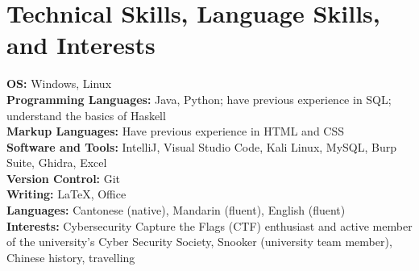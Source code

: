 \documentclass[letterpaper,10pt]{article}
\begin{document}
\section{Technical Skills, Language Skills, and Interests}
\begin{itemize}[leftmargin=0.15in, label={}]
    \small{\item{
    \textbf{OS:} Windows, Linux \\ \vspace{5pt}
    \textbf{Programming Languages:} Java, Python; have previous experience in SQL; understand the basics of Haskell \\ \vspace{5pt}
    \textbf{Markup Languages:} Have previous experience in HTML and CSS \\ \vspace{3pt}
    \textbf{Software and Tools:} IntelliJ, Visual Studio Code, Kali Linux, MySQL, Burp Suite, Ghidra, Excel \\ \vspace{5pt}
    \textbf{Version Control:} Git \\ \vspace{5pt}
    \textbf{Writing:} \LaTeX, Office \\ \vspace{5pt}
    \textbf{Languages:} Cantonese (native), Mandarin (fluent), English (fluent) \\ \vspace{5pt}
    \textbf{Interests:} Cybersecurity Capture the Flags (CTF) enthusiast and active member of the university's Cyber Security Society, Snooker (university team member), Chinese history, travelling
    }}
\end{itemize}
\end{document}
